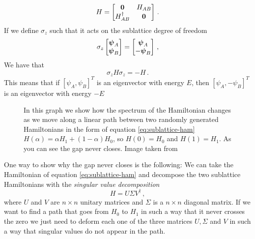     \begin{equation}
        H=\begin{bmatrix}
        \boldsymbol{0} & H_{AB}\\
        H_{AB}^\dag & \boldsymbol{0}
        \end{bmatrix}\,.
        \label{eq:sublattice-ham}
    \end{equation}
    If we define $\sigma_z$ such that it acts on the sublattice degree of freedom
    \begin{equation}
        \sigma_z
        \begin{bmatrix}
        \boldsymbol{\psi}_A\\
        \boldsymbol{\psi}_B
        \end{bmatrix}=
        \begin{bmatrix}
        \boldsymbol{\psi}_A\\
        -\boldsymbol{\psi}_B
        \end{bmatrix}\,,
    \end{equation}
    We have that
    \begin{equation}
        \sigma_z H \sigma_z=-H\,.
    \end{equation}
    This means that if $[\psi_A,\psi_B]^T$ is an eigenvector with energy $E$, then $[\psi_A,-\psi_B]^T$ is an eigenvector with energy $-E$

    \begin{figure}[h]
        \centering
        
        \caption{
        In this graph we show how the spectrum of the Hamiltonian changes as we move along a linear path between two randomly generated Hamiltonians in the form of equation \ref{eq:sublattice-ham} $H(\alpha)=\alpha H_1+ (1-\alpha)H_0$, so $H(0)=H_0$ and $H(1)=H_1$. As you can see the gap never closes. Image taken from \cite{topocondmat}}
        \label{fig:ham-path-2}
    \end{figure}  
    One way to show why the gap never closes is the following:
    We can take the Hamiltonian of equation \ref{eq:sublattice-ham} and decompose the two sublattice Hamiltonians with the \textit{singular value decomposition} 
    \begin{equation}
        H=U\Sigma V^\dag\,,
    \end{equation}
    where $U$ and $V$ are $n\times n$ unitary matrices and $\Sigma$ is a $n\times n$ diagonal matrix. If we want to find a path that goes from $H_0$ to $H_1$ in such a way that it never crosses the zero we just need to deform each one of the three matrices $U,\Sigma$ and $V$ in such a way that singular values do not appear in the path.
